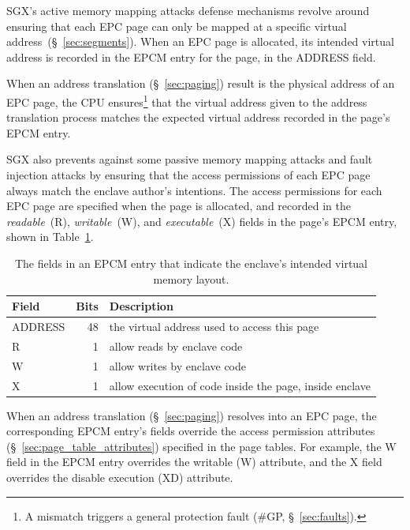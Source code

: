 SGX's active memory mapping attacks defense mechanisms revolve around ensuring
that each EPC page can only be mapped at a specific virtual
address~(\S~\ref{sec:segments}). When an EPC page is allocated, its intended
virtual address is recorded in the EPCM entry for the page, in the ADDRESS
field.

When an address translation (\S~\ref{sec:paging}) result is the physical
address of an EPC page, the CPU ensures\footnote{A mismatch triggers a general
protection fault (\#GP, \S~\ref{sec:faults}).} that the virtual address given
to the address translation process matches the expected virtual address
recorded in the page's EPCM entry.

SGX also prevents against some passive memory mapping attacks and fault
injection attacks by ensuring that the access permissions of each EPC page
always match the enclave author's intentions. The access permissions for each
EPC page are specified when the page is allocated, and recorded in the
\textit{readable}~(R), \textit{writable}~(W), and \textit{executable}~(X)
fields in the page's EPCM entry, shown in
Table~\ref{fig:sgx_epcm_access_fields}.

\begin{table}[hbt]
  \centering
  \begin{tabularx}{\columnwidth}{| l | r | X |}
  \hline
  \textbf{Field} & \textbf{Bits} & \textbf{Description}\\
  \hline
  ADDRESS & 48 & the virtual address used to access this page\\
  \hline
  R & 1 & allow reads by enclave code\\
  \hline
  W & 1 & allow writes by enclave code\\
  \hline
  X & 1 & allow execution of code inside the page, inside enclave\\
  \hline
  \end{tabularx}
  \caption{
    The fields in an EPCM entry that indicate the enclave's intended virtual
    memory layout.
  }
  \label{fig:sgx_epcm_access_fields}
\end{table}

When an address translation (\S~\ref{sec:paging}) resolves into an EPC page,
the corresponding EPCM entry's fields override the access permission attributes
(\S~\ref{sec:page_table_attributes}) specified in the page tables. For example,
the W field in the EPCM entry overrides the writable (W) attribute, and the X
field overrides the disable execution (XD) attribute.


